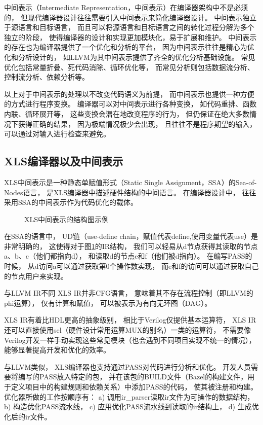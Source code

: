 中间表示（Intermediate Representation，中间表示）在编译器架构中不是必须的，
但现代编译器设计往往需要引入中间表示来简化编译器设计。
中间表示独立于源语言和目标语言，
而且可以将源语言和目标语言之间的转化过程分解为多个独立的阶段，
使得编译器的设计和实现更加模块化，易于扩展和维护。
中间表示的存在也为编译器提供了一个优化和分析的平台，
因为中间表示往往是精心为优化和分析设计的，
如LLVM为其中间表示提供了齐全的优化分析基础设施。
常见优化包括常量折叠、死代码消除、循环优化等，
而常见分析则包括数据流分析、控制流分析、依赖分析等。

以上对于中间表示的处理以不改变代码语义为前提，
而中间表示也提供一种方便的方式进行程序变换。
编译器可以对中间表示进行各种变换，
如代码重排、函数内联、循环展开等，
这些变换会潜在地改变程序的行为，
但仍保证在绝大多数情况下获得正确的结果，
因为极端情况极少会出现，
且往往不是程序期望的输入，
可以通过对输入进行检查来避免。

\subsection{XLS编译器以及中间表示}

XLS中间表示是一种静态单赋值形式（Static Single Assignment，SSA）的Sea-of-Nodes语言，
是XLS编译器中描述硬件结构的中间语言。
在编译器设计中，
往往采用SSA的中间表示作为代码优化的载体。

\begin{figure}[h]
\centering

\caption{XLS中间表示的结构图示例}
\label{fig.3}
\end{figure}

在SSA的语言中，
UD链（use-define chain，赋值代表define,使用变量代表use）是非常明确的，
这使得对于图\ref{fig.3}的IR结构，
我们可以轻易从d节点获得其读取的节点a、b、c（他们都指向d），
和读取d的节点e和f（他们被d指向）。
在编写PASS的时候，
从d访问a可以通过获取第0个操作数实现，
而e和f的访问可以通过获取自己的节点用户来实现。

与LLVM IR不同
XLS IR并非CFG语言，
意味着其不存在流程控制（即LLVM的phi运算），
仅有计算和赋值，
可以被表示为有向无环图（DAG）。

XLS IR有着比HDL更高的抽象级别，
相比于Verilog仅提供基本运算符，
XLS IR还可以直接使用sel（硬件设计常用运算MUX的别名）一类的运算符，
不需要像Verilog开发一样手动实现这些常见模块（也会遇到不同项目实现不统一的情况），
能够显著提高开发和优化的效率。

与LLVM类似，
XLS编译器也支持通过PASS对代码进行分析和优化。
开发人员需要将编写的PASS放入特定的包，
并在该包的BUILD文件（Bazel的构建文件，用于定义项目中的构建规则和依赖关系）中添加PASS的代码，
使其被注册和构建。
优化器所做的工作按顺序有：
a) 调用ir\_parser读取ir文件为可操作的数据结构，
b) 构造优化PASS流水线，
c) 应用优化PASS流水线到读取的ir结构上，
d) 生成优化后的ir文件。

